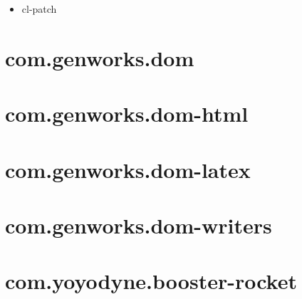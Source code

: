 \documentclass [11pt]{book}
\begin{document}
\label{subsec:functionandmacrodefinitions}



\begin{itemize}

\item {}cl-patch





\end{itemize}





\section{com.genworks.dom }

\label{sec:com.genworks.dom}







\section{com.genworks.dom-html }

\label{sec:com.genworks.dom-html}







\section{com.genworks.dom-latex }

\label{sec:com.genworks.dom-latex}







\section{com.genworks.dom-writers }

\label{sec:com.genworks.dom-writers}







\section{com.yoyodyne.booster-rocket }

\label{sec:com.yoyodyne.booster-rocket}
\end{document}
